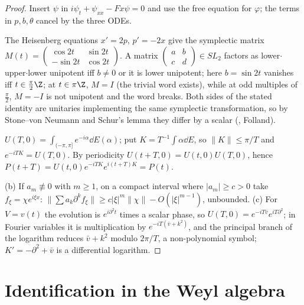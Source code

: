 \begin{proof}
Insert $\psi$ in $i\psi_t+\psi_{xx}-Fx\psi=0$ and use the free equation for $\varphi$; the terms in $p,b,\theta$ cancel by the three ODEs.

The Heisenberg equations $x'=2p$, $p'=-2x$ give the symplectic matrix $M(t)=\begin{pmatrix}\cos2t&\sin2t\\-\sin2t&\cos2t\end{pmatrix}$. A matrix $\begin{pmatrix}a&b\\c&d\end{pmatrix}\in SL_2$ factors as lower$\cdot$upper$\cdot$lower unipotent iff $b\ne0$ or it is lower unipotent; here $b=\sin2t$ vanishes iff $t\in\frac\pi2\Z$; at $t\in\pi\Z$, $M=I$ (the trivial word exists), while at odd multiples of $\frac\pi2$, $M=-I$ is not unipotent and the word breaks. Both sides of the stated identity are unitaries implementing the same symplectic transformation, so by Stone--von Neumann and Schur's lemma they differ by a scalar (\cf, Folland).

$U(T,0)=\int_{(-\pi,\pi]}e^{-i\alpha}\dd E(\alpha)$; put $K=T^{-1}\int\alpha\dd E$, so $\|K\|\le\pi/T$ and $e^{-iTK}=U(T,0)$. By periodicity $U(t+T,0)=U(t,0)U(T,0)$, hence $P(t+T)=U(t,0)e^{-iTK}e^{i(t+T)K}=P(t)$.

(b) If $a_m\not\equiv0$ with $m\ge1$, on a compact interval where $|a_m|\ge c>0$ take $f_\xi=\chi e^{i\xi x}$: $\|\sum a_k\partial^kf_\xi\|\ge c|\xi|^m\|\chi\|-O(|\xi|^{m-1})$, unbounded. (c) For $V=v(t)$ the evolution is $e^{i\partial^2t}$ times a scalar phase, so $U(T,0)=e^{-iT\bar v}e^{iT\partial^2}$; in Fourier variables it is multiplication by $e^{-iT(\bar v+k^2)}$, and the principal branch of the logarithm reduces $\bar v+k^2$ modulo $2\pi/T$, a non-polynomial symbol; $K'=-\partial^2+\bar v$ is a differential logarithm.

\end{proof}

\section{Identification in the Weyl algebra}

